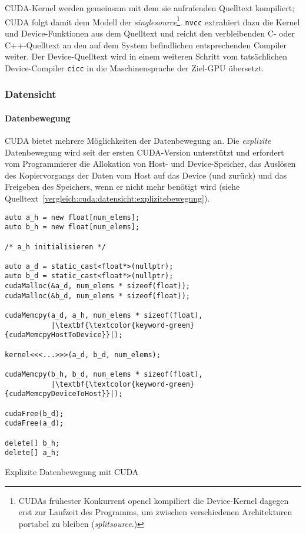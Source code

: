 CUDA-Kernel werden gemeinsam mit dem sie aufrufenden Quelltext kompiliert; CUDA
folgt damit dem Modell der \textit{\gls{singlesource}}\footnote{CUDAs frühester
Konkurrent \gls{opencl} kompiliert die Device-Kernel dagegen erst zur Laufzeit
des Programms, um zwischen verschiedenen Architekturen portabel zu bleiben
(\textit{\gls{splitsource}}.)}. \texttt{nvcc} extrahiert dazu die Kernel und
Device-Funktionen aus dem Quelltext und reicht den verbleibenden C- oder
C++-Quelltext an den auf dem System befindlichen entsprechenden Compiler
weiter. Der Device-Quelltext wird in einem weiteren Schritt vom tatsächlichen
Device-Compiler \texttt{cicc} in die Maschinensprache der Ziel-GPU übersetzt.

\subsubsection{Datensicht}
\label{vergleich:cuda:datensicht}

\paragraph{Datenbewegung}

CUDA bietet mehrere Möglichkeiten der Datenbewegung an. Die \textit{explizite}
Datenbewegung wird seit der ersten CUDA-Version unterstützt und erfordert vom
Programmierer die Allokation von Host- und Device-Speicher, das Auslösen des
Kopiervorgangs der Daten vom Host auf das Device (und zurück) und das Freigeben
des Speichers, wenn er nicht mehr benötigt wird (siehe
Quelltext~\ref{vergleich:cuda:datensicht:explizitebewegung}).

\begin{code}
    \begin{verbatim}
auto a_h = new float[num_elems];
auto b_h = new float[num_elems];

/* a_h initialisieren */

auto a_d = static_cast<float*>(nullptr);
auto b_d = static_cast<float*>(nullptr);
cudaMalloc(&a_d, num_elems * sizeof(float));
cudaMalloc(&b_d, num_elems * sizeof(float));

cudaMemcpy(a_d, a_h, num_elems * sizeof(float),
           |\textbf{\textcolor{keyword-green}{cudaMemcpyHostToDevice}}|);

kernel<<<...>>>(a_d, b_d, num_elems);

cudaMemcpy(b_h, b_d, num_elems * sizeof(float),
           |\textbf{\textcolor{keyword-green}{cudaMemcpyDeviceToHost}}|);

cudaFree(b_d);
cudaFree(a_d);

delete[] b_h;
delete[] a_h;
    \end{verbatim}
    \caption{Explizite Datenbewegung mit CUDA}
    \label{vergleich:cuda:datensicht:explizitebewegung}
\end{code}


